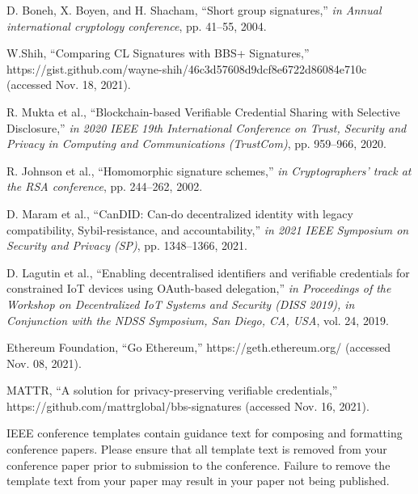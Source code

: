 \documentclass[conference]{IEEEtran}
\begin{document}
\begin{sloppypar}
\begin{thebibliography}{00}
    D. Boneh, X. Boyen, and H. Shacham, ``Short group signatures,'' {\em in Annual international cryptology conference}, pp. 41–55, 2004.
  
    W.Shih, ``Comparing CL Signatures with BBS+ Signatures,'' https://gist.github.com/wayne-shih/46c3d57608d9dcf8e6722d86084e710c (accessed Nov. 18, 2021).
  
    R. Mukta et al., ``Blockchain-based Verifiable Credential Sharing with Selective Disclosure,'' {\em in 2020 IEEE 19th International Conference on Trust, Security and Privacy in Computing and Communications (TrustCom)}, pp. 959–966, 2020.
  
    R. Johnson et al., ``Homomorphic signature schemes,'' {\em in Cryptographers’ track at the RSA conference}, pp. 244–262, 2002.
  
    D. Maram et al., ``CanDID: Can-do decentralized identity with legacy compatibility, Sybil-resistance, and accountability,'' {\em in 2021 IEEE Symposium on Security and Privacy (SP)}, pp. 1348–1366, 2021.
  
    D. Lagutin et al., ``Enabling decentralised identifiers and verifiable credentials for constrained IoT devices using OAuth-based delegation,'' {\em in Proceedings of the Workshop on Decentralized IoT Systems and Security (DISS 2019), in Conjunction with the NDSS Symposium, San Diego, CA, USA}, vol. 24, 2019.
  
    Ethereum Foundation, ``Go Ethereum,'' https://geth.ethereum.org/ (accessed Nov. 08, 2021).
  
    MATTR, ``A solution for privacy-preserving verifiable credentials,''  https://github.com/mattrglobal/bbs-signatures (accessed Nov. 16, 2021).
\end{thebibliography}
\vspace{12pt}
\color{red}
IEEE conference templates contain guidance text for composing and formatting conference papers. Please ensure that all template text is removed from your conference paper prior to submission to the conference. Failure to remove the template text from your paper may result in your paper not being published.

\end{sloppypar}
\end{document}
